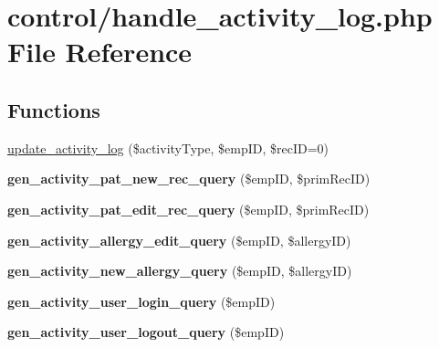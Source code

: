 \hypertarget{handle__activity__log_8php}{\section{control/handle\-\_\-activity\-\_\-log.php File Reference}
\label{handle__activity__log_8php}
}
\subsection*{Functions}
\begin{DoxyCompactItemize}
\item 
\hyperlink{handle__activity__log_8php_a3bb79b6acd51d8001ecfd557799c83aa}{update\-\_\-activity\-\_\-log} (\$activity\-Type, \$emp\-I\-D, \$rec\-I\-D=0)
\item 
\hypertarget{handle__activity__log_8php_aebdcbbcd60209ede1b77fbbface3fec1}{{\bfseries gen\-\_\-activity\-\_\-pat\-\_\-new\-\_\-rec\-\_\-query} (\$emp\-I\-D, \$prim\-Rec\-I\-D)}\label{handle__activity__log_8php_aebdcbbcd60209ede1b77fbbface3fec1}

\item 
\hypertarget{handle__activity__log_8php_a6699fc94168c0df540182f97ff6dd48e}{{\bfseries gen\-\_\-activity\-\_\-pat\-\_\-edit\-\_\-rec\-\_\-query} (\$emp\-I\-D, \$prim\-Rec\-I\-D)}\label{handle__activity__log_8php_a6699fc94168c0df540182f97ff6dd48e}

\item 
\hypertarget{handle__activity__log_8php_a1c302941777c6678840bc88431474877}{{\bfseries gen\-\_\-activity\-\_\-allergy\-\_\-edit\-\_\-query} (\$emp\-I\-D, \$allergy\-I\-D)}\label{handle__activity__log_8php_a1c302941777c6678840bc88431474877}

\item 
\hypertarget{handle__activity__log_8php_a49b407f45fdbc26675b9534a62a6bb49}{{\bfseries gen\-\_\-activity\-\_\-new\-\_\-allergy\-\_\-query} (\$emp\-I\-D, \$allergy\-I\-D)}\label{handle__activity__log_8php_a49b407f45fdbc26675b9534a62a6bb49}

\item 
\hypertarget{handle__activity__log_8php_a22b8e4fec0508102ba4a76bb9bb1db70}{{\bfseries gen\-\_\-activity\-\_\-user\-\_\-login\-\_\-query} (\$emp\-I\-D)}\label{handle__activity__log_8php_a22b8e4fec0508102ba4a76bb9bb1db70}

\item 
\hypertarget{handle__activity__log_8php_a56b59e5bdad20bd7c2dd26e202c088d5}{{\bfseries gen\-\_\-activity\-\_\-user\-\_\-logout\-\_\-query} (\$emp\-I\-D)}\label{handle__activity__log_8php_a56b59e5bdad20bd7c2dd26e202c088d5}


\end{DoxyCompactItemize}

